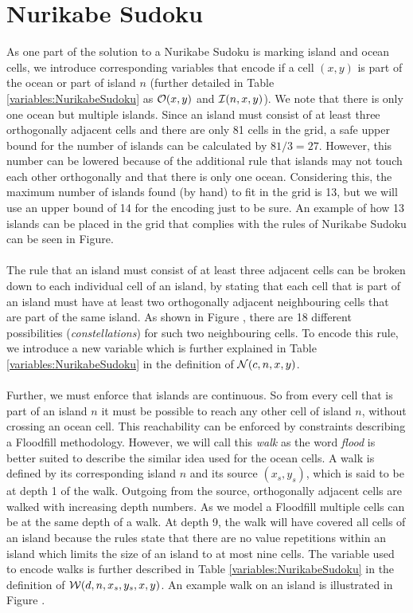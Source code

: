 \section{Nurikabe Sudoku}
As one part of the solution to a Nurikabe Sudoku is marking island and ocean cells, we introduce corresponding variables that encode if a cell $(x,y)$ is part of the ocean or part of island $n$ (further detailed in  Table \ref{variables:NurikabeSudoku} as $\mathcal{O}(x,y)$ and  $\mathcal{I}(n,x,y)$). We note that there is only one ocean but multiple islands. Since an island must consist of at least three orthogonally adjacent cells and there are only 81 cells in the grid, a safe upper bound for the number of islands can be calculated by $81/3=27$. However, this number can be lowered because of the additional rule that islands may not touch each other orthogonally and that there is only one ocean. Considering this, the maximum number of islands found (by hand) to fit in the grid is 13, but we will use an upper bound of 14 for the encoding just to be sure. An example of how 13 islands can be placed in the grid that complies with the rules of Nurikabe Sudoku can be seen in Figure.\\
\\
The rule that an island must consist of at least three adjacent cells can be broken down to each individual cell of an island, by stating that each cell that is part of an island must have at least two orthogonally adjacent neighbouring cells that are part of the same island. As shown in Figure , there are 18 different possibilities (\emph{constellations}) for such two neighbouring cells. To encode this rule, we introduce a new variable which is further explained in Table \ref{variables:NurikabeSudoku} in the definition of $\mathcal{N}(c,n,x,y)$.\\
\\
Further, we must enforce that islands are continuous. So from every cell that is part of an island  $n$ it must be possible to reach any other cell of island $n$, without crossing an ocean cell. This reachability can be enforced by constraints describing a Floodfill methodology. However, we will call this \emph{walk} as the word \emph{flood} is better suited to describe the similar idea used for the ocean cells. A walk is defined by its corresponding island $n$ and its source $(x_s,y_s)$, which is said to be at depth 1 of the walk. Outgoing from the source, orthogonally adjacent cells are walked with increasing depth numbers. As we model a Floodfill multiple cells can be at the same depth of a walk. At depth 9, the walk will have covered all cells of an island because the rules state that there are no value repetitions within an island which limits the size of an island to at most nine cells. The variable used to encode walks is further described in Table \ref{variables:NurikabeSudoku} in the definition of $\mathcal{W}(d,n,x_s,y_s,x,y)$. An example walk on an island is illustrated in Figure .\\


